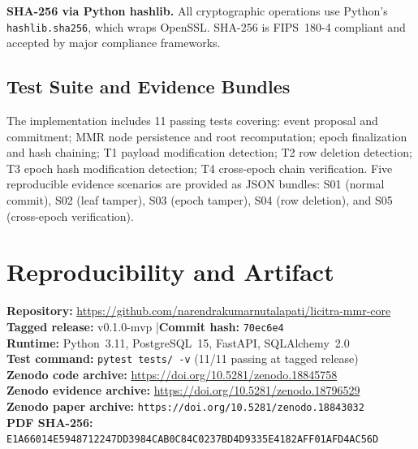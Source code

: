\documentclass{article}
\begin{document}
\textbf{SHA-256 via Python hashlib.} All cryptographic operations use Python's
\texttt{hashlib.sha256}, which wraps OpenSSL. SHA-256 is FIPS~180-4 compliant
and accepted by major compliance frameworks.

\subsection{Test Suite and Evidence Bundles}

The implementation includes 11 passing tests covering: event proposal and
commitment; MMR node persistence and root recomputation; epoch finalization and
hash chaining; T1 payload modification detection; T2 row deletion detection; T3
epoch hash modification detection; T4 cross-epoch chain verification. Five
reproducible evidence scenarios are provided as JSON bundles: S01 (normal
commit), S02 (leaf tamper), S03 (epoch tamper), S04 (row deletion), and S05
(cross-epoch verification).

\section{Reproducibility and Artifact}
\label{sec:reproducibility}

\begin{mdframed}[backgroundcolor=gray!7,linewidth=0.6pt,
  innerleftmargin=10pt,innerrightmargin=10pt,
  innertopmargin=8pt,innerbottommargin=8pt]
\noindent
\textbf{Repository:} \url{https://github.com/narendrakumarnutalapati/licitra-mmr-core}\\[2pt]
\textbf{Tagged release:} v0.1.0-mvp \quad|\quad \textbf{Commit hash:} \texttt{70ec6e4}\\
\textbf{Runtime:} Python~3.11, PostgreSQL~15, FastAPI, SQLAlchemy~2.0\\[2pt]
\textbf{Test command:} \texttt{pytest tests/ -v} \quad(11/11 passing at tagged release)\\[2pt]
\textbf{Zenodo code archive:} \url{https://doi.org/10.5281/zenodo.18845758}\\
\textbf{Zenodo evidence archive:} \url{https://doi.org/10.5281/zenodo.18796529}\\
\textbf{Zenodo paper archive:} \texttt{https://doi.org/10.5281/zenodo.18843032}\\
\textbf{PDF SHA-256:} \texttt{E1A66014E5948712247DD3984CAB0C84C0237BD4D9335E4182AFF01AFD4AC56D}
\end{mdframed}
\end{document}
